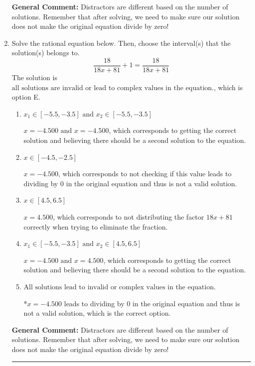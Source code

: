 \documentclass{extbook}[14pt]
\newcommand{\litem}[1]{\item #1

\rule{\textwidth}{0.4pt}}
\begin{document}
\begin{enumerate}
{\textbf{General Comment:} Distractors are different based on the number of solutions. Remember that after solving, we need to make sure our solution does not make the original equation divide by zero!
}
\litem{
Solve the rational equation below. Then, choose the interval(s) that the solution(s) belongs to.
\[ \frac{18}{18x + 81} + 1 = \frac{18}{18x + 81} \]The solution is \( \text{all solutions are invalid or lead to complex values in the equation.} \), which is option E.\begin{enumerate}[label=\Alph*.]
\item \( x_1 \in [-5.5, -3.5] \text{ and } x_2 \in [-5.5,-3.5] \)

$x = -4.500 \text{ and } x = -4.500$, which corresponds to getting the correct solution and believing there should be a second solution to the equation.
\item \( x \in [-4.5,-2.5] \)

$x = -4.500$, which corresponds to not checking if this value leads to dividing by 0 in the original equation and thus is not a valid solution.
\item \( x \in [4.5,6.5] \)

$x = 4.500$, which corresponds to not distributing the factor $18x + 81$ correctly when trying to eliminate the fraction.
\item \( x_1 \in [-5.5, -3.5] \text{ and } x_2 \in [4.5,6.5] \)

$x = -4.500 \text{ and } x = 4.500$, which corresponds to getting the correct solution and believing there should be a second solution to the equation.
\item \( \text{All solutions lead to invalid or complex values in the equation.} \)

*$x = -4.500$ leads to dividing by 0 in the original equation and thus is not a valid solution, which is the correct option.
\end{enumerate}

\textbf{General Comment:} Distractors are different based on the number of solutions. Remember that after solving, we need to make sure our solution does not make the original equation divide by zero!
}
\end{enumerate}
\end{document}
